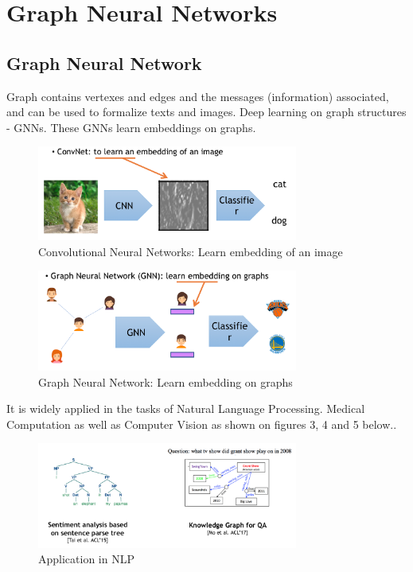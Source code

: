 \chapter{Graph Neural Networks}
\section{Graph Neural Network}
Graph contains vertexes and edges and the messages (information) associated, and can be used to formalize texts and images. Deep learning on graph structures - GNNs. These GNNs learn embeddings on graphs.

\begin{figure}[ht]
\begin{center}
  \includegraphics[width=3.38in]{figs/Embedding_ConvNet.png}
\end{center}
   \caption{Convolutional Neural Networks: Learn embedding of an image}
\label{fig:CV}
\end{figure}

\begin{figure}[ht]
\begin{center}
  \includegraphics[width=3.38in]{figs/Embedding_Graph.png}
\end{center}
   \caption{Graph Neural Network: Learn embedding on graphs}
\label{fig:CV}
\end{figure}

It is widely applied in the tasks of Natural Language Processing. Medical Computation as well as Computer Vision as shown on figures 3, 4 and 5 below.. 
\begin{figure}[ht]
\begin{center}
  \includegraphics[width=3.38in]{figs/NLP.png}
\end{center}
   \caption{Application in NLP}
\label{fig:CV}
\end{figure}

